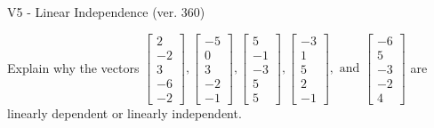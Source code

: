 \begin{exercise}
  \begin{exerciseTitle}V5 - Linear Independence (ver. 360)\end{exerciseTitle}
  \begin{exerciseStatement}
    Explain why the vectors \(\left[\begin{array}{r}
2 \\
-2 \\
3 \\
-6 \\
-2
\end{array}\right] , \left[\begin{array}{r}
-5 \\
0 \\
3 \\
-2 \\
-1
\end{array}\right] , \left[\begin{array}{r}
5 \\
-1 \\
-3 \\
5 \\
5
\end{array}\right] , \left[\begin{array}{r}
-3 \\
1 \\
5 \\
2 \\
-1
\end{array}\right] , \text{ and } \left[\begin{array}{r}
-6 \\
5 \\
-3 \\
-2 \\
4
\end{array}\right]\) are linearly dependent or linearly independent.	



\end{exerciseStatement}
\end{exercise}
